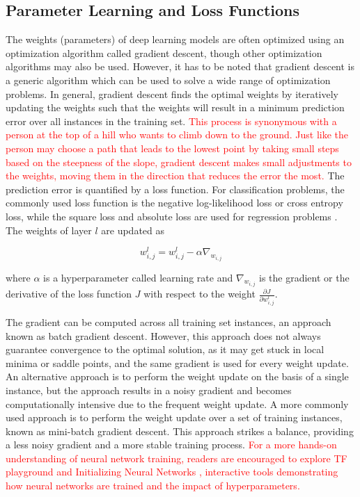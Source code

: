 \documentclass[preprint,12pt]{elsarticle}
\begin{document}
\subsection{Parameter Learning and Loss Functions}
The weights (parameters) of deep learning models are often optimized using an optimization algorithm called gradient descent, though other optimization algorithms may also be used. However, it has to be noted that gradient descent is a generic algorithm which can be used to solve a wide range of optimization problems. In general, gradient descent finds the optimal weights by iteratively updating the weights such that the weights will result in a minimum prediction error over all instances in the training set. \textcolor{red}{This process is synonymous with a person at the top of a hill who wants to climb down to the ground. Just like the person may choose a path that leads to the lowest point by taking small steps based on the steepness of the slope, gradient descent makes small adjustments to the weights, moving them in the direction that reduces the error the most.} The prediction error is quantified by a loss function. For classification problems, the commonly used loss function is the negative log-likelihood loss or cross entropy loss, while the square loss and absolute loss are used for regression problems \citep{wang_comprehensive_2022}. The weights of layer $l$ are updated as

\begin{equation}
{w_{i,j}^l = w_{i,j}^l - \alpha \nabla_{w_{i,j}}}
\end{equation}

\noindent where $\alpha$ is a hyperparameter called learning rate and $\nabla_{w_{i,j}}$ is the gradient or the derivative of the loss function $J$ with respect to the weight $\frac{\partial J}{\partial w_{i,j}^l}$.

The gradient can be computed across all training set instances, an approach known as batch gradient descent. However, this approach does not always guarantee convergence to the optimal solution, as it may get stuck in local minima or saddle points, and the same gradient is used for every weight update. An alternative approach is to perform the weight update on the basis of a single instance, but the approach results in a noisy gradient and becomes computationally intensive due to the frequent weight update. A more commonly used approach is to perform the weight update over a set of training instances, known as mini-batch gradient descent. This approach strikes a balance, providing a less noisy gradient and a more stable training process. \textcolor{red}{For a more hands-on understanding of neural network training, readers are encouraged to explore TF playground \citep{carter_tensorflow_nodate} and Initializing Neural Networks \citep{guo_ai_nodate}, interactive tools demonstrating how neural networks are trained and the impact of hyperparameters.}
\end{document}
